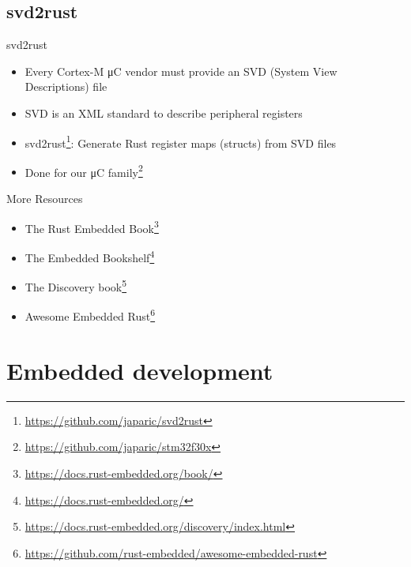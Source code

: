 \documentclass[aspectratio=1610,14pt,t]{beamer}
\begin{document}
\subsection{svd2rust}

\begin{frame}[c]{svd2rust}
  \begin{itemize}
    \item Every Cortex-M μC vendor must provide an SVD (System View
      Descriptions) file
    \item SVD is an XML standard to describe peripheral registers
    \item svd2rust\footnote{\url{https://github.com/japaric/svd2rust}}:
      Generate Rust register maps (structs) from SVD files
    \item Done for our μC family\footnote{\url{https://github.com/japaric/stm32f30x}}
  \end{itemize}
\end{frame}

\begin{frame}[c]{More Resources}
  \begin{itemize}
    \item The Rust Embedded Book\footnote{\url{https://docs.rust-embedded.org/book/}}
    \item The Embedded Bookshelf\footnote{\url{https://docs.rust-embedded.org/}}
    \item The Discovery book\footnote{\url{https://docs.rust-embedded.org/discovery/index.html}}
    \item Awesome Embedded Rust\footnote{\url{https://github.com/rust-embedded/awesome-embedded-rust}}
  \end{itemize}
\end{frame}

\section{Embedded development}
\end{document}

